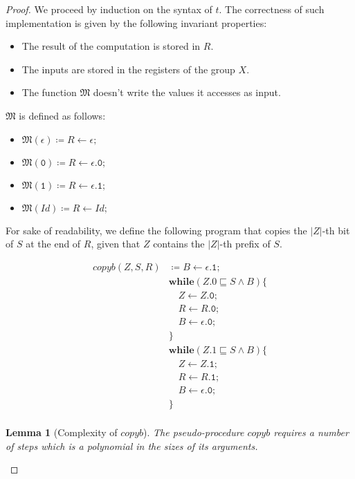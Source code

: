 \documentclass[10pt]{amsart}
\newcommand{\zero}{\mathtt{0}}
\newcommand{\one}{\mathtt{1}}
\newcommand{\while}[2]{\mathbf{while}(#1)\{#2\}}
\newcommand{\takes}{\leftarrow}
\newcommand{\MM}{\mathfrak M}
\newtheorem{lemma}{Lemma}
\begin{document}
\begin{proof}
We proceed by induction on the syntax of $t$. The correctness of such implementation is given by the following invariant properties:
\begin{itemize}
\item The result of the computation is stored in $R$.
\item The inputs are stored in the registers of the group $X$.
\item The function $\MM$ doesn't write the values it accesses as input.
\end{itemize}

$\MM$ is defined as follows:
\begin{itemize}
\item $\MM(\epsilon)\coloneqq R \takes \epsilon ;$
\item $\MM(\zero)\coloneqq R \takes \epsilon.\zero ;$
\item $\MM(\one)\coloneqq R \takes \epsilon.\one ;$
\item $\MM(Id)\coloneqq R \takes Id ;$
\end{itemize}

For sake of readability, we define the following program that copies the $|Z|$-th bit of $S$ at the end of $R$, given that $Z$ contains the $|Z|$-th prefix of $S$.

\begin{align*}
copyb (Z, S, R)&\coloneqq B \takes \epsilon.\one;\\
& \while{Z.0 \sqsubseteq S\land B}{\\
& \quad Z \takes Z.\zero;\\
& \quad R \takes R.\zero;\\
& \quad B \takes \epsilon.\zero;\\
& }\\
& \while{Z.1 \sqsubseteq S\land B}{\\
& \quad Z \takes Z.\one;\\
& \quad R \takes R.\one;\\
& \quad B \takes \epsilon.\zero;\\
& }\\
\end{align*}

\begin{lemma}[Complexity of $copyb$]
\label{lemma:compcopyb}
The pseudo-procedure $copyb$ requires a number of steps which is a polynomial in the sizes of its arguments.
\end{lemma}


\end{proof}
\end{document}
